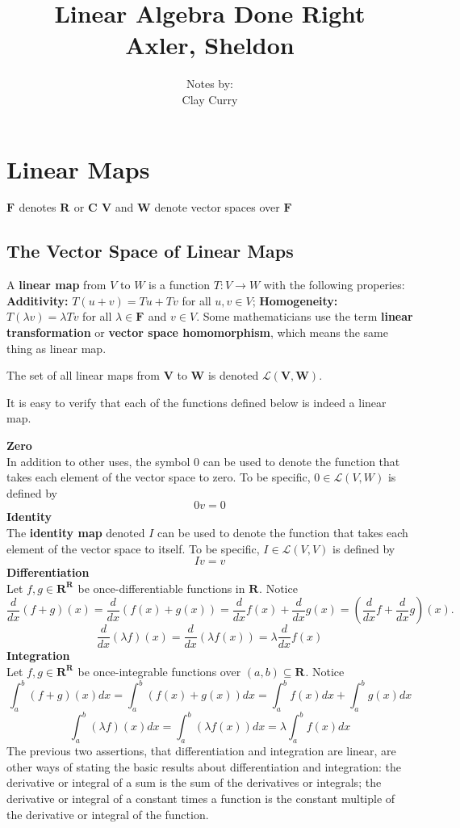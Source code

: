 \documentclass[11pt]{article} %
\title{Linear Algebra Done Right \\ Axler, Sheldon}
\author{Notes by:  \\ Clay Curry}
\date{}
\newcommand\R[1]{\text{$\mathbf{R^{#1}}$}}
\newcommand\C[1]{\text{$\mathbf{C^{#1}}$}}
\newcommand\F[1]{\text{$\mathbf{F^{#1}}$}}
\newcommand\V{\text{$\mathbf{V}$}}
\newcommand\W{\text{$\mathbf{W}$}}
\newcommand\0{\text{$\mathbf{0}$}}
\renewcommand\L[2]{\mathcal{L}(#1,#2)}
\begin{document}
\section{Linear Maps}
{\points
{$\F{}$ denotes $\R{}$ or $\C{}$}
{$\V$ and $\W$ denote vector spaces over $\F{}$}
}

\subsection{The Vector Space of Linear Maps}
{
A \textbf{linear map} from $V$ to $W$ is a function $T : V \to W$ with the following properies:
\points
{\textbf{Additivity: } $T(u+v) = Tu + Tv$ for all $u, v \in V$;}
{\textbf{Homogeneity: } $T(\lambda v) = \lambda Tv$ for all $\lambda \in \F{}$ and $v \in V$.}
}
Some mathematicians use the term \textbf{linear transformation} or \textbf{vector space homomorphism}, which means the same thing as linear map. 

\definition{$\L{V}{W}$}
{The set of all linear maps from $\V$ to $\W$ is denoted $\L{\V}{\W}$.}

It is easy to verify that each of the functions defined below is indeed a linear map.

{
\textbf{Zero}\\
In addition to other uses, the symbol $0$ can be used to denote the function that takes each element of the vector space to zero. To be specific, $0 \in \L{V}{W}$ is defined by $$0v = 0$$
\textbf{Identity}\\
The \textbf{identity map} denoted $I$ can be used to denote the function that takes each element of the vector space to itself. To be specific, $I \in \L{V}{V}$ is defined by $$Iv = v$$
\textbf{Differentiation}\\
Let $f, g \in \R{\R{}}$ be once-differentiable functions in $\R{}$. Notice 
$$\frac{d}{dx}(f + g)(x) =  \frac{d}{dx}(f(x) + g(x)) = \frac{d}{dx}f(x) + \frac{d}{dx}g(x) = (\frac{d}{dx}f + \frac{d}{dx}g)(x).$$
$$\frac{d}{dx}(\lambda f)(x) = \frac{d}{dx}(\lambda f(x)) = \lambda \frac{d}{dx}f(x)$$
\textbf{Integration}\\
Let $f, g \in \R{\R{}}$ be once-integrable functions over $(a,b) \subseteq \R{}$. Notice 
$$\int_a^b (f + g)(x) dx =  \int_a^b (f(x) + g(x)) dx = \int_a^b f(x) dx + \int_a^b g(x)dx$$
$$\int_a^b (\lambda f)(x) dx = \int_a^b (\lambda f(x)) dx= \lambda \int_a^b f(x) dx$$
}
The previous two assertions, that differentiation and integration are linear, are other ways of stating the basic results about differentiation and integration: the derivative or integral of a sum is the sum of the derivatives or integrals; the derivative or integral of a constant times a function is the constant multiple of the derivative or integral of the function.
\end{document}
